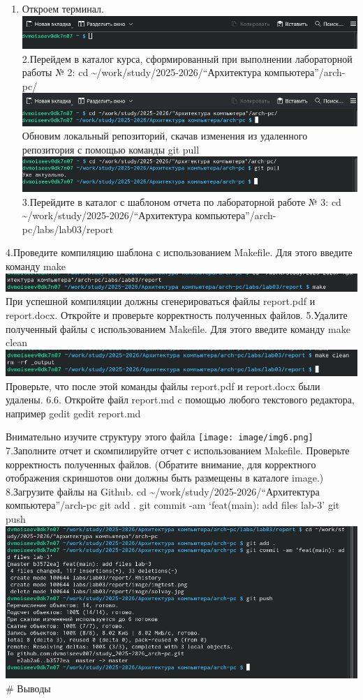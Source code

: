 \documentclass[
  english,
  russian,
  12pt,
  a4paper,
  DIV=11,
  numbers=noendperiod]{scrreprt}
\providecommand{\tightlist}{%
  \setlength{\itemsep}{0pt}\setlength{\parskip}{0pt}}
\begin{document}
\begin{enumerate}
\def\labelenumi{\arabic{enumi}.}
\tightlist
\item
  Откроем терминал.
  \includegraphics[width=0.5\linewidth,height=\textheight,keepaspectratio]{image/img1.png}
  2.Перейдем в каталог курса, сформированный при выполнении лабораторной
  работы № 2: cd
  \textasciitilde/work/study/2025-2026/\enquote{Архитектура
  компьютера}/arch-pc/
  \includegraphics[width=0.5\linewidth,height=\textheight,keepaspectratio]{image/img2.png}
  Обновим локальный репозиторий, скачав изменения из удаленного
  репозитория с помощью команды git pull
  \includegraphics[width=0.5\linewidth,height=\textheight,keepaspectratio]{image/img3.png}
  3.Перейдите в каталог с шаблоном отчета по лабораторной работе № 3: cd
  \textasciitilde/work/study/2025-2026/\enquote{Архитектура
  компьютера}/arch-pc/labs/lab03/report
\end{enumerate}

4.Проведите компиляцию шаблона с использованием Makefile. Для этого
введите команду make
\includegraphics[width=0.5\linewidth,height=\textheight,keepaspectratio]{image/img4.png}
При успешной компиляции должны сгенерироваться файлы report.pdf и
report.docx. Откройте и проверьте корректность полученных файлов.
5.Удалите полученный файлы с использованием Makefile. Для этого введите
команду make clean
\includegraphics[width=0.5\linewidth,height=\textheight,keepaspectratio]{image/img5.png}
Проверьте, что после этой команды файлы report.pdf и report.docx были
удалены. 6.6. Откройте файл report.md c помощью любого текстового
редактора, например gedit gedit report.md

Внимательно изучите структуру этого файла
\texttt{[image: image/img6.png]}
7.Заполните отчет и скомпилируйте отчет с использованием Makefile.
Проверьте корректность полученных файлов. (Обратите внимание, для
корректного отображения скриншотов они должны быть размещены в каталоге
image.) 8.Загрузите файлы на Github. cd
\textasciitilde/work/study/2025-2026/\enquote{Архитектура
компьютера}/arch-pc git add . git commit -am \enquote*{feat(main): add
files lab-3} git push
\includegraphics[width=0.5\linewidth,height=\textheight,keepaspectratio]{image/img8.png}
\# Выводы
\end{document}
